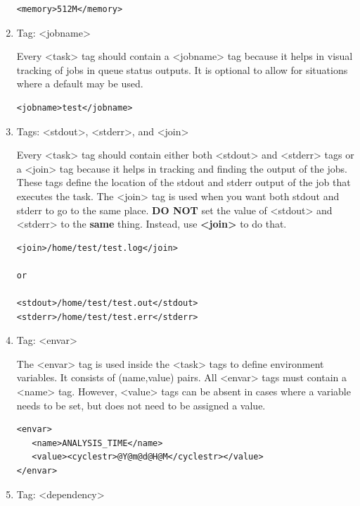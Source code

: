 \documentclass[11pt,fleqn]{report}              %
\begin{document}
\begin{enumerate}
\lstset{language=XML}   
\begin{lstlisting}[frame=trBL]
<memory>512M</memory>
\end{lstlisting}


\item Tag: <jobname>

Every <task> tag should contain a <jobname> tag because it helps in visual tracking of jobs in queue status outputs. It is optional to allow for situations where a default may be used.

\lstset{language=XML}   
\begin{lstlisting}[frame=trBL]
<jobname>test</jobname>
\end{lstlisting}


\item Tags: <stdout>, <stderr>, and <join>

Every <task> tag should contain either both <stdout> and <stderr> tags or a <join> tag because it helps in tracking and finding the output of the jobs. These tags define the location of the stdout and stderr output of the job that executes the task. The <join> tag is used when you want both stdout and stderr to go to the same place. {\bf DO NOT} set the value of <stdout> and <stderr> to the {\bf same} thing. Instead, use {\bf <join>} to do that.

\lstset{language=XML}   
\begin{lstlisting}[frame=trBL]
<join>/home/test/test.log</join>

or

<stdout>/home/test/test.out</stdout>
<stderr>/home/test/test.err</stderr>

\end{lstlisting}


\item Tag: <envar>

The <envar> tag is used inside the <task> tags to define environment variables. It consists of (name,value) pairs. All <envar> tags must contain a <name> tag. However, <value> tags can be absent in cases where a variable needs to be set, but does not need to be assigned a value.

\lstset{language=XML}   
\begin{lstlisting}[frame=trBL]
<envar>
   <name>ANALYSIS_TIME</name>
   <value><cyclestr>@Y@m@d@H@M</cyclestr></value>
</envar>
\end{lstlisting}


\item Tag: <dependency>


\end{enumerate}
\end{document}
